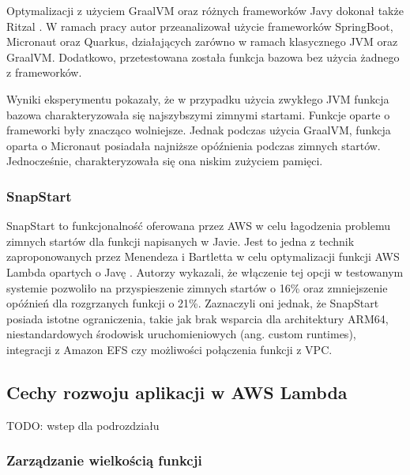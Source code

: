 Optymalizacji z użyciem GraalVM oraz różnych frameworków Javy dokonał także Ritzal \cite{ritzal2020optimizing}.
W ramach pracy autor przeanalizował użycie frameworków SpringBoot, Micronaut oraz Quarkus, działających zarówno w ramach klasycznego JVM oraz GraalVM.
Dodatkowo, przetestowana została funkcja bazowa bez użycia żadnego z frameworków.

Wyniki eksperymentu pokazały, że w przypadku użycia zwykłego JVM funkcja bazowa charakteryzowała się najszybszymi zimnymi startami.
Funkcje oparte o frameworki były znacząco wolniejsze. Jednak podczas użycia GraalVM, funkcja oparta o Micronaut posiadała najniższe opóźnienia podczas zimnych startów.
Jednocześnie, charakteryzowała się ona niskim zużyciem pamięci.

\subsubsection*{SnapStart}

SnapStart to funkcjonalność oferowana przez AWS w celu łagodzenia problemu zimnych startów dla funkcji napisanych w Javie. 
Jest to jedna z technik zaproponowanych przez Menendeza i Bartletta w celu optymalizacji funkcji AWS Lambda opartych o Javę \cite{menéndez2023performancebestpracticesusing}. 
Autorzy wykazali, że włączenie tej opcji w testowanym systemie pozwoliło na przyspieszenie zimnych startów o 16\% oraz zmniejszenie opóźnień dla rozgrzanych funkcji o 21\%. 
Zaznaczyli oni jednak, że SnapStart posiada istotne ograniczenia, takie jak brak wsparcia dla architektury ARM64, niestandardowych środowisk uruchomieniowych (ang. custom runtimes), integracji z Amazon EFS czy możliwości połączenia funkcji z VPC.

\subsection{Cechy rozwoju aplikacji w AWS Lambda}\label{chapter:przeglad_literatury_wyniki_cechy_rozwoju}

TODO: wstep dla podrozdziału

\subsubsection*{Zarządzanie wielkością funkcji}

